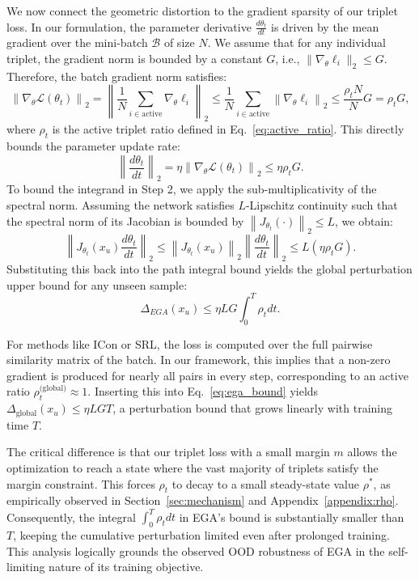 \documentclass{article}
\begin{document}
We now connect the geometric distortion to the gradient sparsity of our triplet loss.
In our formulation, the parameter derivative $\frac{d\theta_t}{dt}$ is driven by the mean gradient over the mini-batch $\mathcal{B}$ of size $N$.
We assume that for any individual triplet, the gradient norm is bounded by a constant $G$, i.e., $\|\nabla_{\theta}\ell_i\|_2 \leq G$.
Therefore, the batch gradient norm satisfies:
\begin{equation}
	\left\| \nabla_{\theta} \mathcal{L}(\theta_t) \right\|_2 = \left\| \frac{1}{N} \sum_{i \in \text{active}} \nabla_{\theta} \ell_i \right\|_2 \leq \frac{1}{N} \sum_{i \in \text{active}} \left\| \nabla_{\theta} \ell_i \right\|_2 \leq \frac{\rho_t N}{N}
	G = \rho_t G, \end{equation} where $\rho_t$ is the active triplet ratio defined in Eq.~\eqref{eq:active_ratio}.
This directly bounds the parameter update rate:
\begin{equation}
	\left\| \frac{d\theta_t}{dt} \right\|_2 = \eta \left\| \nabla_{\theta} \mathcal{L}(\theta_t) \right\|_2 \leq \eta \rho_t G.
\end{equation}
To bound the integrand in Step 2, we apply the sub-multiplicativity of the spectral norm.
Assuming the network satisfies $L$-Lipschitz continuity such that the spectral norm of its Jacobian is bounded by $\left\| J_{\theta_t}(\cdot) \right\|_2 \leq L$, we obtain:
\begin{equation}
	\left\| J_{\theta_t}(x_u) \frac{d\theta_t}{dt} \right\|_2 \leq \left\| J_{\theta_t}(x_u) \right\|_2 \left\| \frac{d\theta_t}{dt} \right\|_2 \leq L (\eta \rho_t G).
\end{equation}
Substituting this back into the path integral bound yields the global perturbation upper bound for any unseen sample:
\begin{equation}
	\Delta_{EGA}(x_u) \leq \eta L G \int_{0}^{T} \rho_t dt. \label{eq:ega_bound}
\end{equation}

For methods like ICon or SRL, the loss is computed over the full pairwise similarity matrix of the batch.
In our framework, this implies that a non-zero gradient is produced for nearly all pairs in every step, corresponding to an active ratio $\rho_t^{\text{(global)}} \approx 1$.
Inserting this into Eq.~\eqref{eq:ega_bound} yields $\Delta_{\text{global}}(x_u) \leq \eta L G T$, a perturbation bound that grows linearly with training time $T$.

The critical difference is that our triplet loss with a small margin $m$ allows the optimization to reach a state where the vast majority of triplets satisfy the margin constraint.
This forces $\rho_t$ to decay to a small steady-state value $\rho^*$, as empirically observed in Section~\ref{sec:mechanism} and Appendix~\ref{appendix:rho}.
Consequently, the integral $\int_0^T \rho_t dt$ in EGA's bound is substantially smaller than $T$, keeping the cumulative perturbation limited even after prolonged training.
This analysis logically grounds the observed OOD robustness of EGA in the self-limiting nature of its training objective.
\end{document}

